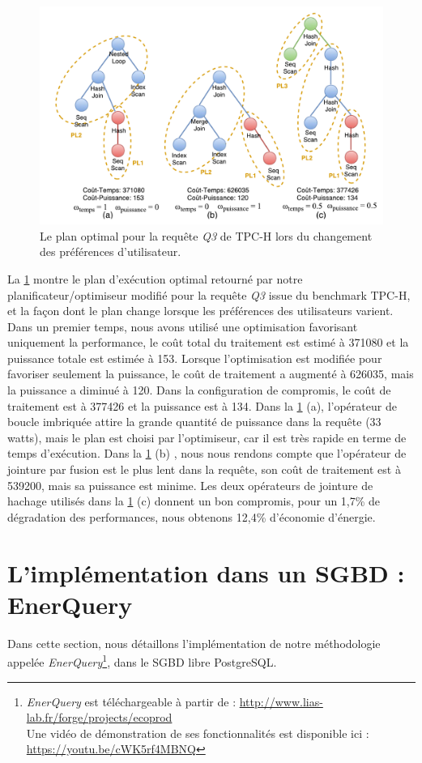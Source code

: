 \begin{figure}
	\centering
	\includegraphics[scale=0.5]{chapitre5/chap5Fig/q3-plans.pdf}
	\caption{Le plan optimal pour la requête \textit{Q3} de TPC-H lors du changement des préférences d'utilisateur.}
	\label{fig:q3-plans}
\end{figure}

La \ref{fig:q3-plans} montre le plan d'exécution optimal retourné par notre planificateur/optimiseur modifié pour la requête \textit{Q3} issue du benchmark TPC-H, et la façon dont le plan change lorsque les préférences des utilisateurs varient. Dans un premier temps, nous avons utilisé une optimisation favorisant uniquement la performance, le coût total du traitement est estimé à 371080 et la puissance totale est estimée à 153. Lorsque l'optimisation est modifiée pour favoriser seulement la puissance, le coût de traitement a augmenté à 626035, mais la puissance a diminué à 120. Dans la configuration de compromis, le coût de traitement est à 377426 et la puissance est à 134. Dans la \ref{fig:q3-plans} (a), l'opérateur de boucle imbriquée attire la grande quantité de puissance dans la requête (33 watts), mais le plan est choisi par l'optimiseur, car il est très rapide en terme de temps d'exécution. Dans la \ref{fig:q3-plans} (b) , nous nous rendons compte que l'opérateur de jointure par fusion est le plus lent dans la requête, son coût de traitement est à 539200, mais sa puissance est minime. Les deux opérateurs de jointure de hachage utilisés dans la \ref{fig:q3-plans} (c) donnent un bon compromis, pour un 1,7\% de dégradation des performances, nous obtenons 12,4\% d'économie d'énergie.

\section{L'implémentation dans un SGBD : EnerQuery}\label{sec:EcoProDGUI}
Dans cette section, nous détaillons l'implémentation de notre méthodologie appelée \textit{EnerQuery}\footnote{\textit{EnerQuery} est téléchargeable à partir de : \url{http://www.lias-lab.fr/forge/projects/ecoprod}\\Une vidéo de démonstration de ses fonctionnalités est disponible ici : \url{https://youtu.be/cWK5rf4MBNQ}}, dans le SGBD libre PostgreSQL.

